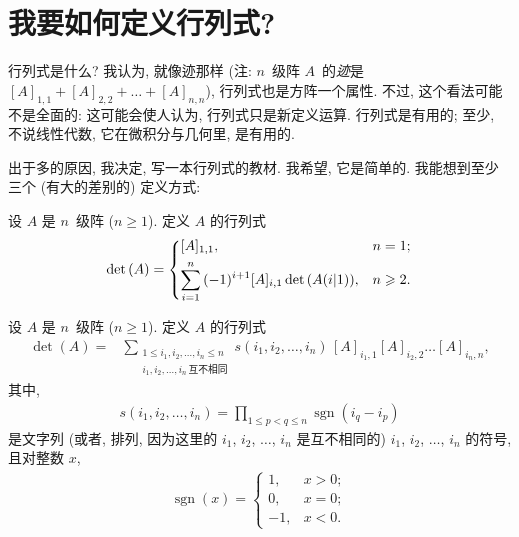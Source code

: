 \documentclass[../libro]{subfiles}
\begin{document}

\section{我要如何定义行列式?}

行列式是什么?
我认为,
就像迹那样
(注: \(n\)~级阵 \(A\)~的\emph{迹}是
\([A]_{1,1} + [A]_{2,2} + \dots + [A]_{n,n}\)),
行列式也是方阵一个属性.
不过, 这个看法可能不是全面的:
这可能会使人认为,
行列式只是新定义运算.
行列式是有用的;
至少, 不说线性代数,
它在微积分与几何里, 是有用的.

出于多的原因, 我决定,
写一本行列式的教材.
我希望, 它是简单的.
我能想到至少三个 (有大的差别的) 定义方式:

\begin{definition}[归纳定义]
    设 \(A\) 是 \(n\)~级阵 (\(n \geq 1\)).
    定义 \(A\) 的行列式
    \begin{align*}
        \det {(A)}
        =
        \begin{dcases}
            [A]_{1,1},
             & n = 1;    \\
            \sum_{i = 1}^{n}
            {(-1)^{i+1} [A]_{i,1} \det {(A(i|1))}},
             & n \geq 2.
        \end{dcases}
    \end{align*}
\end{definition}

\begin{definition}[组合定义]
    设 \(A\) 是 \(n\)~级阵 (\(n \geq 1\)).
    定义 \(A\) 的行列式
    \begin{align*}
        \det {(A)}
        = {} &
        \sum_{\substack{
        1 \leq i_1, i_2, \dots, i_n \leq n \\
                i_1, i_2, \dots, i_n\,\text{互不相同}
            }}
        {s(i_1, i_2, \dots, i_n)\,
            [A]_{i_1,1} [A]_{i_2,2} \dots [A]_{i_n,n}},
    \end{align*}
    其中,
    \begin{align*}
        s(i_1, i_2, \dots, i_n)
        = \prod_{1 \leq p < q \leq n}
        {\operatorname{sgn} {(i_q - i_p)}}
    \end{align*}
    是文字列
    (或者, 排列,
    因为这里的 \(i_1\), \(i_2\), \(\dots\), \(i_n\)
    是互不相同的)
    \(i_1\), \(i_2\), \(\dots\), \(i_n\) 的符号,
    且对整数 \(x\),
    \begin{align*}
        \operatorname{sgn} {(x)}
        =
        \begin{cases}
            1,  & x > 0; \\
            0,  & x = 0; \\
            -1, & x < 0.
        \end{cases}
    \end{align*}
\end{definition}
\end{document}
